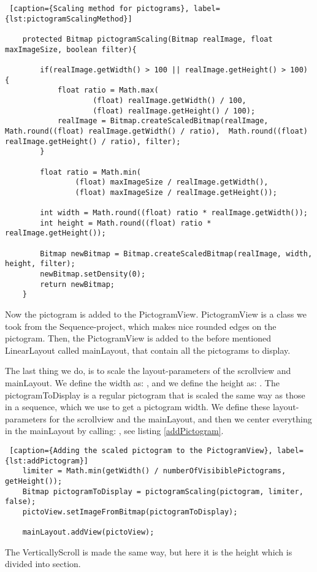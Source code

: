 \begin{lstlisting} [caption={Scaling method for pictograms}, label={lst:pictogramScalingMethod}]

    protected Bitmap pictogramScaling(Bitmap realImage, float maxImageSize, boolean filter){

        if(realImage.getWidth() > 100 || realImage.getHeight() > 100) {
            float ratio = Math.max(
                    (float) realImage.getWidth() / 100,
                    (float) realImage.getHeight() / 100);
            realImage = Bitmap.createScaledBitmap(realImage, Math.round((float) realImage.getWidth() / ratio),  Math.round((float) realImage.getHeight() / ratio), filter);
        }

        float ratio = Math.min(
                (float) maxImageSize / realImage.getWidth(),
                (float) maxImageSize / realImage.getHeight());

        int width = Math.round((float) ratio * realImage.getWidth());
        int height = Math.round((float) ratio * realImage.getHeight());

        Bitmap newBitmap = Bitmap.createScaledBitmap(realImage, width, height, filter);
        newBitmap.setDensity(0);
        return newBitmap;
    }
\end{lstlisting}

Now the pictogram is added to the PictogramView. PictogramView is a class we took from the Sequence-project, which makes nice rounded edges on the pictogram. Then, the PictogramView is added to the before mentioned LinearLayout called mainLayout, that contain all the pictograms to display.

The last thing we do, is to scale the layout-parameters of the scrollview and mainLayout. We define the width as: , and we define the height as: . The pictogramToDisplay is a regular pictogram that is scaled the same way as those in a sequence, which we use to get a pictogram width. We define these layout-parameters for the scrollview and the mainLayout, and then we center everything in the mainLayout by calling: , see listing \ref{addPictogram}.

\begin{lstlisting} [caption={Adding the scaled pictogram to the PictogramView}, label={lst:addPictogram}]
	limiter = Math.min(getWidth() / numberOfVisibiblePictograms, getHeight());
	Bitmap pictogramToDisplay = pictogramScaling(pictogram, limiter, false);
	pictoView.setImageFromBitmap(pictogramToDisplay);
	
	mainLayout.addView(pictoView);
\end{lstlisting}

The VerticallyScroll is made the same way, but here it is the height which is divided into section.


